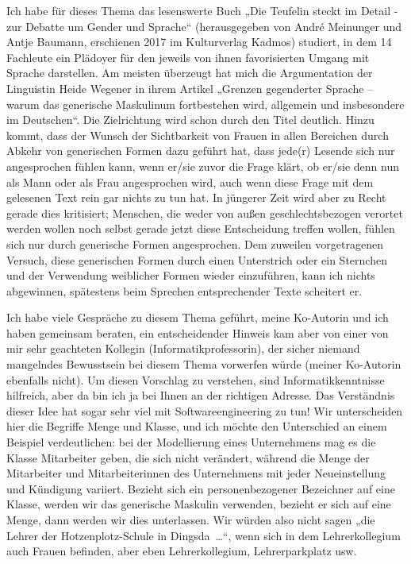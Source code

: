 Ich habe für dieses Thema das lesenswerte Buch „Die Teufelin steckt im Detail - zur Debatte um Gender und Sprache“ (herausgegeben von André Meinunger und Antje Baumann, erschienen 2017 im Kulturverlag Kadmos) studiert, in dem 14 Fachleute ein Plädoyer für den jeweils von ihnen favorisierten Umgang mit Sprache darstellen. Am meisten überzeugt hat mich die Argumentation der Linguistin Heide Wegener in ihrem Artikel „Grenzen gegenderter Sprache – warum das generische Maskulinum fortbestehen wird, allgemein und insbesondere im Deutschen“. Die Zielrichtung wird schon durch den Titel deutlich. Hinzu kommt, dass der Wunsch der Sichtbarkeit von Frauen in allen Bereichen durch Abkehr von generischen Formen dazu geführt hat, dass jede(r) Lesende sich nur angesprochen fühlen kann, wenn er/sie zuvor die Frage klärt, ob er/sie denn nun als Mann oder als Frau angesprochen wird, auch wenn diese Frage mit dem gelesenen Text rein gar nichts zu tun hat. In jüngerer Zeit wird aber zu Recht gerade dies kritisiert; Menschen, die weder von außen geschlechtsbezogen verortet werden wollen noch selbst gerade jetzt diese Entscheidung treffen wollen, fühlen sich nur durch generische Formen angesprochen. Dem zuweilen vorgetragenen Versuch, diese generischen Formen durch einen Unterstrich oder ein Sternchen und der Verwendung weiblicher Formen wieder einzuführen, kann ich nichts abgewinnen, spätestens beim Sprechen entsprechender Texte scheitert er.

Ich habe viele Gespräche zu diesem Thema geführt, meine Ko-Autorin und ich haben gemeinsam beraten, ein entscheidender Hinweis kam aber von einer von mir sehr geachteten Kollegin (Informatikprofessorin), der sicher niemand mangelndes Bewusst\-sein bei diesem Thema vorwerfen würde (meiner Ko-Autorin ebenfalls nicht). Um diesen Vorschlag zu verstehen, sind Informatikkenntnisse hilfreich, aber da bin ich ja bei Ihnen an der richtigen Adresse. Das Verständnis dieser Idee hat sogar sehr viel mit Softwareengineering zu tun! Wir unterscheiden hier die Begriffe Menge und Klasse, und ich möchte den Unterschied an einem Beispiel verdeutlichen: bei der Modellierung eines Unternehmens mag es die Klasse Mitarbeiter geben, die sich nicht verändert, während die Menge der Mitarbeiter und Mitarbeiterinnen des Unternehmens mit jeder Neueinstellung und Kündigung variiert. Bezieht sich ein personen\-bezogener Bezeichner auf eine Klasse, werden wir das generische Maskulin verwenden, bezieht er sich auf eine Menge, dann werden wir dies unterlassen. Wir würden also nicht sagen „die Lehrer der Hotzenplotz-Schule in Dingsda~\ldots“, wenn sich in dem Lehrerkollegium auch Frauen befinden, aber eben Lehrerkollegium, Lehrerparkplatz usw.  

